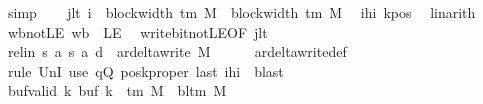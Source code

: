 \begin{isabellebody}
\ simp\isanewline
\ \ \isamarkupfalse%
\ jlt{\isacharcolon}{\kern0pt}\ {\isachardoublequoteopen}i\ {\isacharminus}{\kern0pt}\ block{\isacharunderscore}{\kern0pt}width\ {\isacharparenleft}{\kern0pt}{\isasymGamma}{\isacharunderscore}{\kern0pt}tm\ M{\isacharparenright}{\kern0pt}\ {\isacharless}{\kern0pt}\ block{\isacharunderscore}{\kern0pt}width\ {\isacharparenleft}{\kern0pt}{\isasymGamma}{\isacharunderscore}{\kern0pt}tm\ M{\isacharparenright}{\kern0pt}{\isachardoublequoteclose}\ \isamarkupfalse%
\ ihi\ kpos\ \isamarkupfalse%
\ linarith\isanewline
\ \ \isamarkupfalse%
\ wb{\isacharunderscore}{\kern0pt}not{\isacharunderscore}{\kern0pt}LE{\isacharcolon}{\kern0pt}\ {\isachardoublequoteopen}{\isacharquery}{\kern0pt}wb\ {\isasymnoteq}\ LE{}{\isachardoublequoteclose}\ \isamarkupfalse%
\ write{\isacharunderscore}{\kern0pt}bit{\isacharunderscore}{\kern0pt}not{\isacharunderscore}{\kern0pt}LE{}{\isacharbrackleft}{\kern0pt}OF\ jlt{\isacharbrackright}{\kern0pt}\ \isakeywordONE{{\isachardot}{\kern0pt}}\isamarkupfalse%
\isanewline
\ \ \isamarkupfalse%
\ rel{\isacharunderscore}{\kern0pt}in{\isacharcolon}{\kern0pt}\ {\isachardoublequoteopen}{\isacharparenleft}{\kern0pt}{\isacharquery}{\kern0pt}s{\isacharcomma}{\kern0pt}\ {\isacharquery}{\kern0pt}a{\isacharcomma}{\kern0pt}\ {\isacharquery}{\kern0pt}s{\isacharprime}{\kern0pt}{\isacharcomma}{\kern0pt}\ {\isacharquery}{\kern0pt}a{\isacharprime}{\kern0pt}{\isacharcomma}{\kern0pt}\ {\isacharquery}{\kern0pt}d{\isacharparenright}{\kern0pt}\ {\isasymin}\ ar{\isacharunderscore}{\kern0pt}delta{\isacharunderscore}{\kern0pt}write\ M{\isachardoublequoteclose}\isanewline
\ \ \ \ \isamarkupfalse%
\ ar{\isacharunderscore}{\kern0pt}delta{\isacharunderscore}{\kern0pt}write{\isacharunderscore}{\kern0pt}def\isanewline
\ \ \ \ \isamarkupfalse%
\ {\isacharparenleft}{\kern0pt}rule\ UnI{}{\isacharparenright}{\kern0pt}\ {\isacharparenleft}{\kern0pt}use\ qQ\ poskproper\ last\ ihi\ \ blast{\isacharparenright}{\kern0pt}\isanewline
\ \ \isamarkupfalse%
\ buf{\isacharunderscore}{\kern0pt}valid{\isacharcolon}{\kern0pt}\ {\isachardoublequoteopen}{\isasymforall}k{\isachardot}{\kern0pt}\ buf\ k\ {\isasymin}\ {\isasymGamma}{\isacharunderscore}{\kern0pt}tm\ M\ {\isasymunion}\ {\isacharbraceleft}{\kern0pt}bl{\isacharunderscore}{\kern0pt}tm\ M{\isacharbraceright}{\kern0pt}{\isachardoublequoteclose}\isanewline
\ \ \ \ \isamarkupfalse%

\end{isabellebody}
